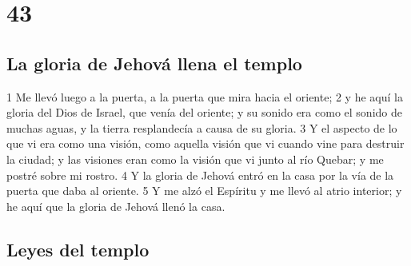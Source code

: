 \chapter{43}

\section*{La gloria de Jehová llena el templo}

1 Me llevó luego a la puerta, a la puerta que mira hacia el oriente;
2 y he aquí la gloria del Dios de Israel, que venía del oriente; y su sonido era como el sonido de muchas aguas, y la tierra resplandecía a causa de su gloria.
3 Y el aspecto de lo que vi era como una visión, como aquella visión que vi cuando vine para destruir la ciudad; y las visiones eran como la visión que vi junto al río Quebar; y me postré sobre mi rostro.
4 Y la gloria de Jehová entró en la casa por la vía de la puerta que daba al oriente.
5 Y me alzó el Espíritu y me llevó al atrio interior; y he aquí que la gloria de Jehová llenó la casa.

\section*{Leyes del templo}

